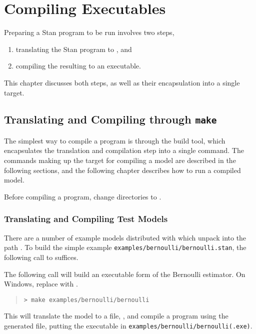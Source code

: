 \chapter{Compiling \CmdStan Executables}\label{compiling.chapter}

\noindent
Preparing a Stan program to be run involves two steps,
%
\begin{enumerate}
\item translating the Stan program to \Cpp, and
\item compiling the resulting \Cpp to an executable.
\end{enumerate}
%
This chapter discusses both steps, as well as their encapsulation into
a single  target.

\section{Translating and Compiling through {\tt\bfseries make}}\label{make-models.section}

The simplest way to compile a \CmdStan program is through the
 build tool, which encapsulates the translation and
compilation step into a single command.  The commands making up the
 target for compiling a model are described in the
following sections, and the following chapter describes how to run a
compiled model.

Before compiling a \CmdStan program, change directories to
.

\subsection{Translating and Compiling Test Models}

There are a number of example models distributed with \CmdStan which
unpack into the path .  To build the simple example
\nolinkurl{examples/bernoulli/bernoulli.stan}, the following call to
 suffices.

%
The following call will build an executable form of the Bernoulli
estimator. On Windows, replace  with .
%
\begin{quote}
\begin{Verbatim}[fontshape=sl]
> make examples/bernoulli/bernoulli
\end{Verbatim}
\end{quote}
%
This will translate the model  to a \Cpp file,
, and compile a \CmdStan program using the
generated \Cpp file, putting the executable in
\nolinkurl{examples/bernoulli/bernoulli(.exe)}.

